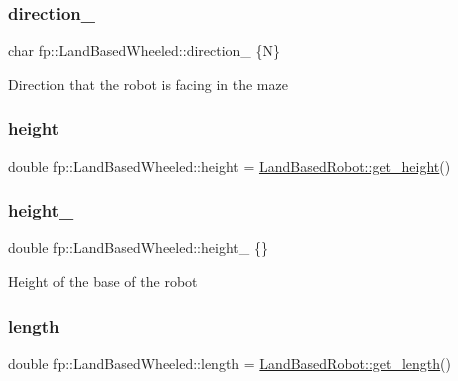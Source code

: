 \subsubsection{\texorpdfstring{direction\+\_\+}{direction\_}}
{\footnotesize\ttfamily char fp\+::\+Land\+Based\+Wheeled\+::direction\+\_\+ \{\textquotesingle{}N\textquotesingle{}\}\hspace{0.3cm}{\ttfamily [protected]}}

Direction that the robot is facing in the maze \mbox{\label{classfp_1_1_land_based_wheeled_ae56bdd84440e468928e4f416394d5dde}} 
\subsubsection{\texorpdfstring{height}{height}}
{\footnotesize\ttfamily double fp\+::\+Land\+Based\+Wheeled\+::height = \hyperlink{classfp_1_1_land_based_robot_ac77253c989c417ee26654541c50669d4}{Land\+Based\+Robot\+::get\+\_\+height}()}

\mbox{\label{classfp_1_1_land_based_wheeled_a2a5ae9e9307a22c9538f51ab366d7f57}} 
\subsubsection{\texorpdfstring{height\+\_\+}{height\_}}
{\footnotesize\ttfamily double fp\+::\+Land\+Based\+Wheeled\+::height\+\_\+ \{\}\hspace{0.3cm}{\ttfamily [protected]}}

Height of the base of the robot \mbox{\label{classfp_1_1_land_based_wheeled_a99e87d729bfd9bee5924a387a11052e6}} 
\subsubsection{\texorpdfstring{length}{length}}
{\footnotesize\ttfamily double fp\+::\+Land\+Based\+Wheeled\+::length = \hyperlink{classfp_1_1_land_based_robot_adb03fbded9a3b0553301bcc0322cb1c1}{Land\+Based\+Robot\+::get\+\_\+length}()}

